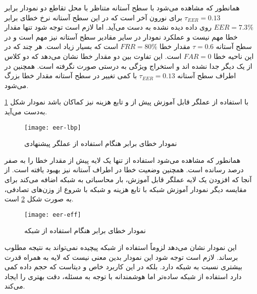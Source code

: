 همانطور که مشاهده می‌شود با سطح آستانه متناظر با محل تقاطع دو نمودار برابر  
$\tau_{EER} = 0.13$
برای نورون آخر است که در این سطح آستانه نرخ خطای برابر  
$EER = 7.3 \%$
 روی داده دیده نشده به دست می‌آید. اما لازم است توجه شود تنها مقدار خطا مهم نیست و عملکرد نمودار در سایر مقادیر سطح آستانه نیز مهم است و در سطح آستانه 
 $\tau = 0.6$
  مقدار خطا 
$FRR=80\%$  
   است که بسیار زیاد است. هر چند که در این ناحیه خطا
  $FAR =0$
است. این تفاوت بین دو مقدار خطا نشان می‌دهد که دو کلاس  از یک دیگر جدا نشده اند و استخراج ویژگی به درستی صورت نگرفته است. همچنین در اطراف سطح آستانه 
  $\tau_{EER} = 0.13$
  با کمی تغییر در سطح آستانه مقدار خطا بزرگ می‌شود.


با استفاده از عملگر  قابل آموزش پیش از  و تابع هزینه نیز کماکان  باشد نمودار شکل
\ref{fig:eer-lbp}
به‌دست می‌آید.
\begin{figure}[h]
	\centerline{\texttt{[image: eer-lbp]}}
	\caption{نمودار خطای برابر هنگام استفاده از عملگر  پیشنهادی}
	\label{fig:eer-lbp}
\end{figure}
همانطور که مشاهده می‌شود استفاده از تنها یک لایه 
 پیش از  مقدار خطا را به صفر درصد رسانده است. همچنین وضعیت خطا در اطراف آستانه نیز بهبود یافته است.
از آنجا که افزودن یک لایه عملگر  قابل آموزش، بار محاسباتی به شبکه اضافه می‌کند برای مقایسه دیگر نمودار آموزش شبکه با تابع هزینه  و شبکه
با شروع از وزن‌های تصادفی، به صورت شکل 
\ref{fig:eer-eff}
است.
\begin{figure}[h]
	\centerline{\texttt{[image: eer-eff]}}
	\caption{نمودار خطای برابر هنگام استفاده از شبکه }
	\label{fig:eer-eff}
\end{figure}

این نمودار نشان می‌دهد لزوماً استفاده از شبکه پیچیده نمی‌تواند به نتیجه مطلوب برساند. 
لازم است توجه شود این نمودار بدین معنی نیست که لایه  به همراه  قدرت بیشتری نسبت به شبکه  دارد. بلکه در این کاربرد خاص و دیتاست  که حجم داده کمی دارد استفاده از شبکه ساده‌تر اما هوشمندانه با توجه به مسئله، دقت بهتری را ایجاد می‌کند.
